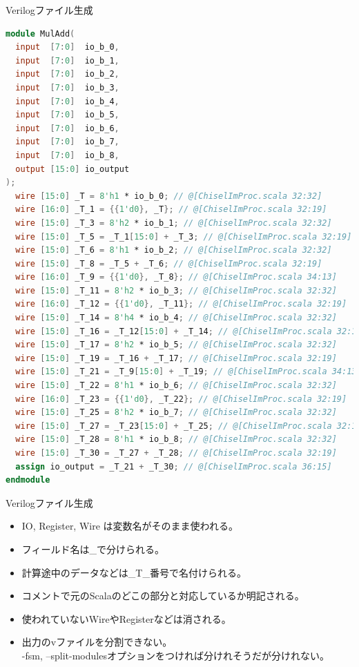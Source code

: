 \begin{frame}[fragile]{Verilogファイル生成}
    \begin{itemize}
        \begin{lstlisting}[language={Verilog}, basicstyle={\tiny}]
module MulAdd(
  input  [7:0]  io_b_0,
  input  [7:0]  io_b_1,
  input  [7:0]  io_b_2,
  input  [7:0]  io_b_3,
  input  [7:0]  io_b_4,
  input  [7:0]  io_b_5,
  input  [7:0]  io_b_6,
  input  [7:0]  io_b_7,
  input  [7:0]  io_b_8,
  output [15:0] io_output
);
  wire [15:0] _T = 8'h1 * io_b_0; // @[ChiselImProc.scala 32:32]
  wire [16:0] _T_1 = {{1'd0}, _T}; // @[ChiselImProc.scala 32:19]
  wire [15:0] _T_3 = 8'h2 * io_b_1; // @[ChiselImProc.scala 32:32]
  wire [15:0] _T_5 = _T_1[15:0] + _T_3; // @[ChiselImProc.scala 32:19]
  wire [15:0] _T_6 = 8'h1 * io_b_2; // @[ChiselImProc.scala 32:32]
  wire [15:0] _T_8 = _T_5 + _T_6; // @[ChiselImProc.scala 32:19]
  wire [16:0] _T_9 = {{1'd0}, _T_8}; // @[ChiselImProc.scala 34:13]
  wire [15:0] _T_11 = 8'h2 * io_b_3; // @[ChiselImProc.scala 32:32]
  wire [16:0] _T_12 = {{1'd0}, _T_11}; // @[ChiselImProc.scala 32:19]
  wire [15:0] _T_14 = 8'h4 * io_b_4; // @[ChiselImProc.scala 32:32]
  wire [15:0] _T_16 = _T_12[15:0] + _T_14; // @[ChiselImProc.scala 32:19]
  wire [15:0] _T_17 = 8'h2 * io_b_5; // @[ChiselImProc.scala 32:32]
  wire [15:0] _T_19 = _T_16 + _T_17; // @[ChiselImProc.scala 32:19]
  wire [15:0] _T_21 = _T_9[15:0] + _T_19; // @[ChiselImProc.scala 34:13]
  wire [15:0] _T_22 = 8'h1 * io_b_6; // @[ChiselImProc.scala 32:32]
  wire [16:0] _T_23 = {{1'd0}, _T_22}; // @[ChiselImProc.scala 32:19]
  wire [15:0] _T_25 = 8'h2 * io_b_7; // @[ChiselImProc.scala 32:32]
  wire [15:0] _T_27 = _T_23[15:0] + _T_25; // @[ChiselImProc.scala 32:19]
  wire [15:0] _T_28 = 8'h1 * io_b_8; // @[ChiselImProc.scala 32:32]
  wire [15:0] _T_30 = _T_27 + _T_28; // @[ChiselImProc.scala 32:19]
  assign io_output = _T_21 + _T_30; // @[ChiselImProc.scala 36:15]
endmodule
        \end{lstlisting}
    \end{itemize}
    
\end{frame}



\begin{frame}{Verilogファイル生成}
\begin{itemize}
    \item IO, Register, Wire は変数名がそのまま使われる。
    \item フィールド名は\_で分けられる。
    \item 計算途中のデータなどは\_T\_番号で名付けられる。
    \item コメントで元のScalaのどこの部分と対応しているか明記される。
    \item 使われていないWireやRegisterなどは消される。
    \item 出力のvファイルを分割できない。\\
        -fsm, --split-modulesオプションをつければ分けれそうだが分けれない。
\end{itemize}
    
\end{frame}